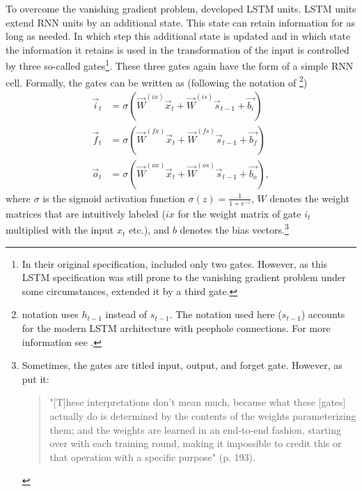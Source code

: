 To overcome the vanishing gradient problem, \citet{Hochreiter:1997} developed LSTM units. LSTM units extend RNN units by an additional state. This state can retain information for as long as needed. In which step this additional state is updated and in which state the information it retains is used in the transformation of the input is controlled by three so-called gates\footnote{In their original specification, \citet{Hochreiter:1997} included only two gates. However, as this LSTM specification was still prone to the vanishing gradient problem under some circumstances, \citet{Gers:2000} extended it by a third gate.}. These three gates again have the form of a simple RNN cell. Formally, the gates can be written as (following the notation of \citet{Lipton:2015}\footnote{\cites{Lipton:2015} notation uses $h_{t-1}$ instead of $s_{t-1}$. The notation used here ($s_{t-1}$) accounts for the modern LSTM architecture with peephole connections. For more information see \cite{Gers:2002}.})
%
\begin{equation} \label{Eq:LSTMgates}
\begin{split}
    \vec{i}_t&=\sigma\left(\vec{W}^{(ix)}\vec{x}_t+\vec{W}^{(is)}\vec{s}_{t-1}+\vec{b_i}\right)\\
    \vec{f}_t&=\sigma\left(\vec{W}^{(fx)}\vec{x}_t+\vec{W}^{(fs)}\vec{s}_{t-1}+\vec{b_f}\right)\\
    \vec{o}_t&=\sigma\left(\vec{W}^{(ox)}\vec{x}_t+\vec{W}^{(os)}\vec{s}_{t-1}+\vec{b_o}\right),
\end{split}   
\end{equation}
%
where $\sigma$ is the sigmoid activation function $\sigma(z)=\frac{1}{1+e^{-z}}$, $W$ denotes the weight matrices that are intuitively labeled ($ix$ for the weight matrix of gate $i_t$ multiplied with the input $x_t$ etc.), and $b$ denotes the bias vectors.\footnote{Sometimes, the gates are titled input, output, and forget gate. However, as \citet{chollet:2018} put it:
\vspace{0.75\dimexpr-\topsep-\partopsep}
\begin{quote}
    "[T]hese interpretations don’t mean much, because what these [gates] actually do is determined by the contents of the weights parameterizing them; and the weights are learned in an end-to-end fashion, starting over with each training round, making it impossible to credit this or that operation with a specific purpose" (p. 193).
\end{quote}\vspace{\dimexpr-\topsep-\partopsep}
}

